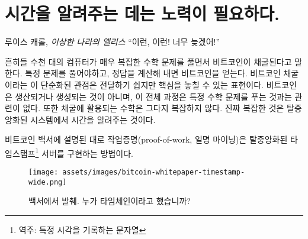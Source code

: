 \chapter{시간을 알려주는 데는 노력이 필요하다.}
\label{les:17}

\begin{chapquote}{루이스 캐롤, \textit{이상한 나라의 앨리스}}
	\enquote{이런, 이런! 너무 늦겠어!}
\end{chapquote}

\begin{comment}
	It is often said that bitcoins are mined because thousands of computers
	work on solving \textit{very complex} mathematical problems. Certain problems
	are to be solved, and if you compute the right answer, you \enquote{produce} a
	bitcoin. While this simplified view of bitcoin mining might be easier to
	convey, it does miss the point somewhat. Bitcoins aren't produced or
	created, and the whole ordeal is not really about solving particular
	math problems. Also, the math isn't particularly complex. What is
	complex is \textit{telling the time} in a decentralized system.
\end{comment}
흔히들 수천 대의 컴퓨터가 매우 복잡한 수학 문제를 풀면서 비트코인이 채굴된다고 말한다.
특정 문제를 풀어야하고, 정답을 계산해 내면 비트코인을 얻는다.
비트코인 채굴이라는 이 단순화된 관점은 전달하기 쉽지만 핵심을 놓칠 수 있는 표현이다.
비트코인은 생산되거나 생성되는 것이 아니며, 이 전체 과정은 특정 수학 문제를 푸는 것과는 관련이 없다.
또한 채굴에 활용되는 수학은 그다지 복잡하지 않다. 
진짜 복잡한 것은 탈중앙화된 시스템에서 시간을 알려주는 것이다.

\begin{comment}
	As outlined in the whitepaper, the proof-of-work system (aka mining) is
	a way to implement a distributed timestamp server.
\end{comment}
비트코인 백서에 설명된 대로 작업증명(proof-of-work, 일명 마이닝)은 탈중앙화된 타임스탬프\footnote{역주: 특정 시각을 기록하는 문자열} 서버를 구현하는 방법이다.

\begin{figure}
	\texttt{[image: assets/images/bitcoin-whitepaper-timestamp-wide.png]}
	\caption{백서에서 발췌. 누가 타임체인이라고 했습니까?}
	\label{fig:bitcoin-whitepaper-timestamp-wide}
\end{figure}

